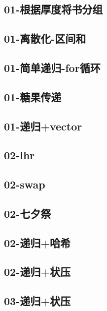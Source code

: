 \documentclass[10pt,a4paper]{article}
\begin{document}
\subsection{01-根据厚度将书分组}

\subsection{01-离散化-区间和}

\subsection{01-简单递归-for循环}

\subsection{01-糖果传递}

\subsection{01-递归+vector}

\subsection{02-lhr}

\subsection{02-swap}

\subsection{02-七夕祭}

\subsection{02-递归+哈希}

\subsection{02-递归+状压}

\subsection{03-递归+状压}

\end{document}
